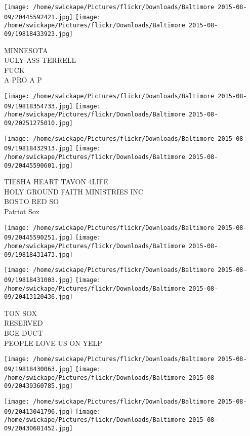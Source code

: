 \documentclass[10pt,letterpaper]{article}
\begin{document}
\texttt{[image: /home/swickape/Pictures/flickr/Downloads/Baltimore 2015-08-09/20445592421.jpg]}
\texttt{[image: /home/swickape/Pictures/flickr/Downloads/Baltimore 2015-08-09/19818433923.jpg]}

MINNESOTA\\
UGLY ASS TERRELL\\
FUCK\\
A PRO A P\\
\pagebreak

\texttt{[image: /home/swickape/Pictures/flickr/Downloads/Baltimore 2015-08-09/19818354733.jpg]}
\texttt{[image: /home/swickape/Pictures/flickr/Downloads/Baltimore 2015-08-09/20251275010.jpg]}

\texttt{[image: /home/swickape/Pictures/flickr/Downloads/Baltimore 2015-08-09/19818432913.jpg]}
\texttt{[image: /home/swickape/Pictures/flickr/Downloads/Baltimore 2015-08-09/20445590601.jpg]}

TIESHA HEART TAVON 4LIFE\\
HOLY GROUND FAITH MINISTRIES INC\\
BOSTO RED SO\\
Patriot Sox\\
\pagebreak

\texttt{[image: /home/swickape/Pictures/flickr/Downloads/Baltimore 2015-08-09/20445590251.jpg]}
\texttt{[image: /home/swickape/Pictures/flickr/Downloads/Baltimore 2015-08-09/19818431473.jpg]}

\texttt{[image: /home/swickape/Pictures/flickr/Downloads/Baltimore 2015-08-09/19818431003.jpg]}
\texttt{[image: /home/swickape/Pictures/flickr/Downloads/Baltimore 2015-08-09/20413120436.jpg]}

TON SOX\\
RESERVED\\
BGE DUCT\\
PEOPLE LOVE US ON YELP\\
\pagebreak

\texttt{[image: /home/swickape/Pictures/flickr/Downloads/Baltimore 2015-08-09/19818430063.jpg]}
\texttt{[image: /home/swickape/Pictures/flickr/Downloads/Baltimore 2015-08-09/20439360785.jpg]}

\texttt{[image: /home/swickape/Pictures/flickr/Downloads/Baltimore 2015-08-09/20413041796.jpg]}
\texttt{[image: /home/swickape/Pictures/flickr/Downloads/Baltimore 2015-08-09/20430681452.jpg]}
\end{document}

